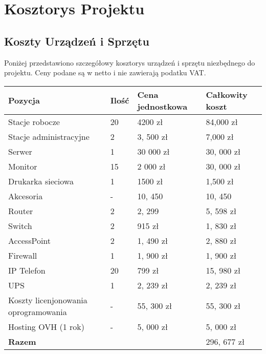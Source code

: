 \section{Kosztorys Projektu}

    \subsection{Koszty Urządzeń i Sprzętu}
        Poniżej przedstawiono szczegółowy kosztorys urządzeń i sprzętu niezbędnego do projektu. Ceny podane są w netto i nie zawierają podatku VAT.

        \begin{flushleft}
            \renewcommand{\arraystretch}{1.5}
            \begin{tabular}{|l|l|l|l|}
                \hline
                    \textbf{Pozycja} & \textbf{Ilość} & \textbf{Cena jednostkowa} & \textbf{Całkowity koszt} \\
                \hline
                Stacje robocze & 20 & 4200 zł & 84,000 zł \\
                Stacje administracyjne & 2 & 3, 500 zł & 7,000 zł \\
                Serwer & 1 & 30 000 zł & 30, 000 zł \\
                Monitor & 15 & 2 000 zł & 30, 000 zł \\
                Drukarka sieciowa & 1 & 1500 zł & 1,500 zł \\
                Akcesoria & - & 10, 450 & 10, 450\\
                Router & 2 & 2, 299 & 5, 598 zł\\
                Switch & 2 & 915 zł& 1, 830  zł\\
                AccessPoint & 2 & 1, 490 zł& 2, 880  zł\\
                Firewall & 1 & 1, 900 zł& 1, 900 zł\\
                IP Telefon & 20 & 799 zł  & 15, 980 zł\\
                UPS & 1 & 2, 239 zł  & 2, 239 zł\\
                Koszty licenjonowania oprogramowania & - & 55, 300 zł  & 55, 300 zł \\
                Hosting OVH (1 rok) & - & 5, 000 zł  & 5, 000 zł \\




                \hline
                    \textbf{Razem} & & & 296, 677 zł \\
                \hline
            \end{tabular}
        \end{flushleft}

